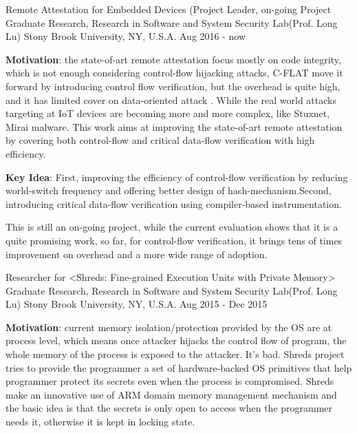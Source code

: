 \begin{cventries}
  \cventry
    {Remote Attestation for Embedded Devices (Project Leader, on-going Project}
    {Graduate Research, Research in Software and System Security Lab(Prof. Long Lu)}
    {Stony Brook University, NY, U.S.A.}
    {Aug 2016 -  now}
    {
     \begin{cvitems}
        \item {\textbf{Motivation}: the state-of-art remote attestation focus mostly on code integrity, which is not enough considering control-flow hijacking attacks, C-FLAT move it forward by introducing control flow verification, but the overhead is quite high, and it has limited cover on data-oriented attack . While the real world attacks targeting at IoT devices are becoming more and more complex, like Stuxnet, Mirai malware. This work aims at improving the state-of-art remote attestation by covering both control-flow and critical data-flow verification with high efficiency.}
        \item {\textbf{Key Idea}: First, improving the efficiency of control-flow verification by reducing world-switch frequency and offering better design of hash-mechanism.Second, introducing critical data-flow verification using compiler-based instrumentation.}
        \item {This is still an on-going project, while the current evaluation shows that it is a quite promising work, so far, for control-flow verification, it brings tens of times improvement on overhead and a more wide range of adoption.}
      \end{cvitems}
    }
  \cventry
    {Researcher for <Shreds: Fine-grained Execution Units with Private Memory>}
    {Graduate Research, Research in Software and System Security Lab(Prof. Long Lu)}
    {Stony Brook University, NY, U.S.A.}
    {Aug 2015 - Dec 2015}
    {
      \begin{cvitems}
        \item {\textbf{Motivation}: current memory isolation/protection provided by the OS are at process level, which means once attacker hijacks the control flow of program, the whole memory of the process is exposed to the attacker. It's bad. Shreds project tries to provide the programmer a set of hardware-backed OS primitives that help programmer protect its secrets even when the process is compromised. Shreds make an innovative use of ARM domain memory management mechanism and the basic idea is that the secrets is only open to access when the programmer needs it, otherwise it is kept in locking state.}

\end{cvitems}}
\end{cventries}
